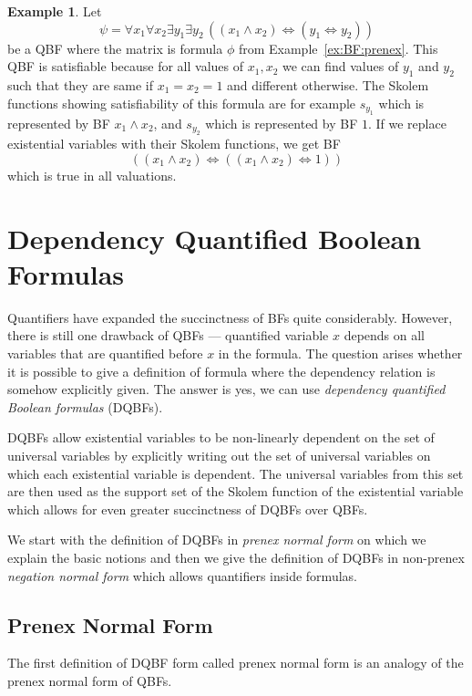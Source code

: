 \documentclass[
  digital, %
  color,
  twoside, %
  table,   %
  nolof,     %
  nolot,     %
]{fithesis3}
\theoremstyle{definition}
\newtheorem{example}{Example}
\theoremstyle{remark}
\newcommand{\lequal}{\Leftrightarrow}
\newcommand{\itholds}{\,}
\begin{document}
\begin{example}
\label{ex:QBF:prenex}
Let 
\[\psi = \forall x_1 \forall x_2 \exists y_1  \exists y_2 \itholds ((x_1 \land x_2) \lequal (y_1 \lequal y_2))\]
be a QBF where the matrix is formula $\phi$ from Example~\ref{ex:BF:prenex}. This QBF is satisfiable because for all values of $x_1, x_2$ we can find values of $y_1$ and $y_2$ such that they are same if $x_1 = x_2 = 1$ and different otherwise. The Skolem functions showing satisfiability of this formula are for example $s_{y_1}$ which is represented by BF $x_1 \land x_2$, and $s_{y_2}$ which is represented by BF $1$. If we replace existential variables with their Skolem functions, we get BF
\[((x_1 \land x_2) \lequal ((x_1 \land x_2) \lequal 1))\]
which is true in all valuations.
\end{example}

\section{Dependency Quantified Boolean Formulas}
Quantifiers have expanded the succinctness of BFs quite considerably. However, there is still one drawback of QBFs --- quantified variable $x$ depends on all variables that are quantified before $x$ in the formula. The question arises whether it is possible to give a definition of formula where the dependency relation is somehow explicitly given. The answer is yes, we can use \emph{dependency quantified Boolean formulas} (DQBFs).

DQBFs allow existential variables to be non-linearly dependent on the set of universal variables by explicitly writing out the set of universal variables on which each existential variable is dependent. The universal variables from this set are then used as the support set of the Skolem function of the existential variable which allows for even greater succinctness of DQBFs over QBFs.  

We start with the definition of DQBFs in \emph{prenex normal form} on which we explain the basic notions and then we give the definition of DQBFs in non-prenex \emph{negation normal form} which allows quantifiers inside formulas.

\subsection{Prenex Normal Form}
The first definition of DQBF form called prenex normal form is an analogy of the prenex normal form of QBFs.
\end{document}
